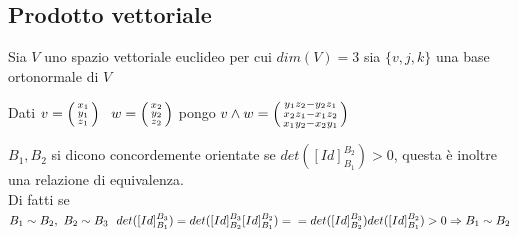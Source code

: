 \documentclass[12px]{article}
\begin{document}
	\subsection{Prodotto vettoriale}
		Sia $V$ uno spazio vettoriale euclideo per cui $dim(V) = 3$ sia $\{v,j,k\}$ una base ortonormale di $V$
		\begin{defi}
			Dati $v = \icol{x_1\\y_1\\z_1}\ \ w=\icol{x_2\\y_2\\z_2}$ pongo $v\wedge w = \left(\begin{smallmatrix}y_1z_2 - y_2z_1\\x_2z_1-x_1z_2\\x_1y_2-x_2y_1\end{smallmatrix}\right)$
		\end{defi}
		\begin{nota}
			$B_1,B_2$ si dicono concordemente orientate se $det([Id]^{B_2}_{B_1})>0$, questa è inoltre una relazione di equivalenza.\\
			Di fatti se $B_1\sim B_2, \ B_2\sim B_3\ \ det([Id]^{B_3}_{B_1})= det([Id]^{B_3}_{B_2}[Id]^{B_2}_{B_1})=\\ =det([Id]^{B_3}_{B_2})det([Id]^{B_2}_{B_1})>0 \Rightarrow B_1\sim B_2$
		\end{nota}
\end{document}
